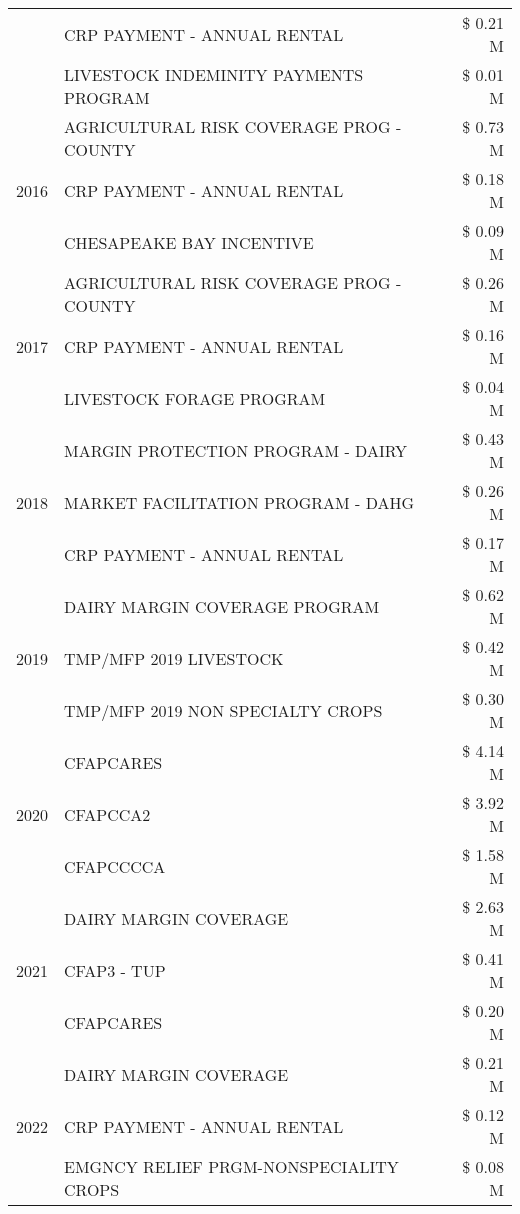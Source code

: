 \begin{tabular}{llr}
 & CRP PAYMENT - ANNUAL RENTAL & \$ 0.21 M \\
 & LIVESTOCK INDEMINITY PAYMENTS PROGRAM & \$ 0.01 M \\
\cline{1-3}
\multirow[t]{3}{*}{2016} & AGRICULTURAL RISK COVERAGE PROG - COUNTY & \$ 0.73 M \\
 & CRP PAYMENT - ANNUAL RENTAL & \$ 0.18 M \\
 & CHESAPEAKE BAY INCENTIVE & \$ 0.09 M \\
\cline{1-3}
\multirow[t]{3}{*}{2017} & AGRICULTURAL RISK COVERAGE PROG - COUNTY & \$ 0.26 M \\
 & CRP PAYMENT - ANNUAL RENTAL & \$ 0.16 M \\
 & LIVESTOCK FORAGE PROGRAM & \$ 0.04 M \\
\cline{1-3}
\multirow[t]{3}{*}{2018} & MARGIN PROTECTION PROGRAM - DAIRY & \$ 0.43 M \\
 & MARKET FACILITATION PROGRAM - DAHG & \$ 0.26 M \\
 & CRP PAYMENT - ANNUAL RENTAL & \$ 0.17 M \\
\cline{1-3}
\multirow[t]{3}{*}{2019} & DAIRY MARGIN COVERAGE PROGRAM & \$ 0.62 M \\
 & TMP/MFP 2019 LIVESTOCK & \$ 0.42 M \\
 & TMP/MFP 2019 NON SPECIALTY CROPS & \$ 0.30 M \\
\cline{1-3}
\multirow[t]{3}{*}{2020} & CFAPCARES & \$ 4.14 M \\
 & CFAPCCA2 & \$ 3.92 M \\
 & CFAPCCCCA & \$ 1.58 M \\
\cline{1-3}
\multirow[t]{3}{*}{2021} & DAIRY MARGIN COVERAGE & \$ 2.63 M \\
 & CFAP3 - TUP & \$ 0.41 M \\
 & CFAPCARES & \$ 0.20 M \\
\cline{1-3}
\multirow[t]{3}{*}{2022} & DAIRY MARGIN COVERAGE & \$ 0.21 M \\
 & CRP PAYMENT - ANNUAL RENTAL & \$ 0.12 M \\
 & EMGNCY RELIEF PRGM-NONSPECIALITY CROPS & \$ 0.08 M \\
\cline{1-3}
\bottomrule
\end{tabular}
